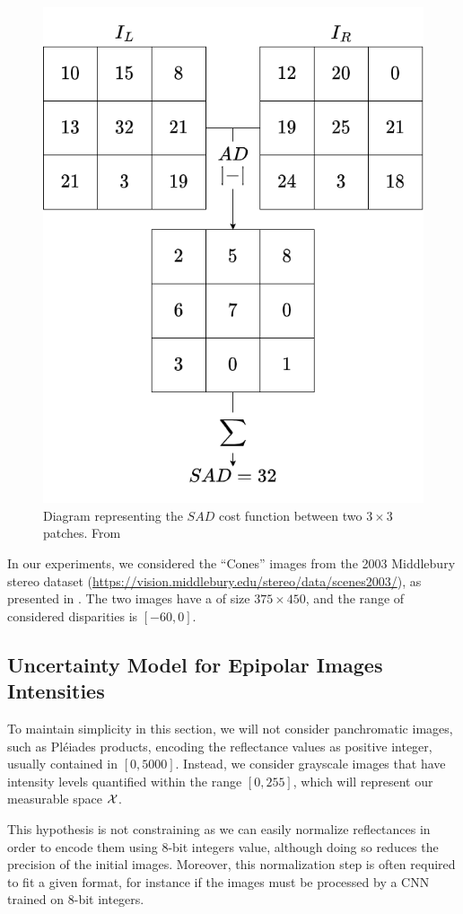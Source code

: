 \begin{figure}
    \centering
    \includegraphics[width=0.5\linewidth]{Images/Chap_4/SAD.png}
    \caption{Diagram representing the $SAD$ cost function between two $3\times3$ patches. From \cite{malinowski_uncertainty_2024}}
    \label{fig:SAD}
\end{figure}

In our experiments, we considered the ``Cones'' images from the 2003 Middlebury stereo dataset (\url{https://vision.middlebury.edu/stereo/data/scenes2003/}), as presented in . The two images have a of size $375 \times 450$, and the range of considered disparities is $[-60, 0]$.

\subsection{Uncertainty Model for Epipolar Images Intensities}
To maintain simplicity in this section, we will not consider panchromatic images, such as Pléiades products, encoding the reflectance values as positive integer, usually contained in $[0, 5000]$. Instead, we consider grayscale images that have intensity levels quantified within the range $[0, 255]$, which will represent our measurable space $\mathcal{X}$.

\begin{remark}
    This hypothesis is not constraining as we can easily normalize reflectances in order to encode them using 8-bit integers value, although doing so reduces the precision of the initial images. Moreover, this normalization step is often required to fit a given format, for instance if the images must be processed by a CNN trained on 8-bit integers.
\end{remark}

